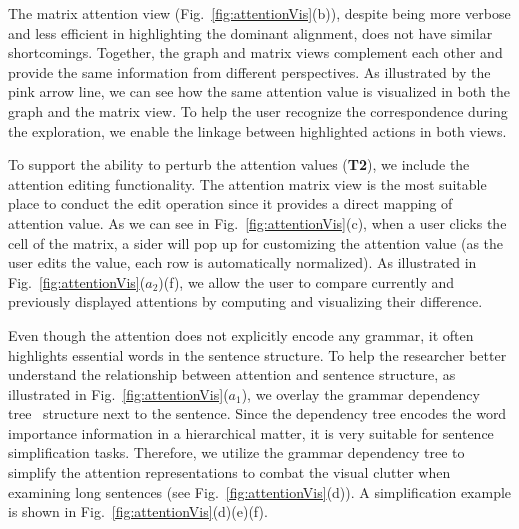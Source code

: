 The matrix attention view (Fig.~\ref{fig:attentionVis}(b)), despite being more verbose and less efficient in highlighting the dominant alignment, does not have similar shortcomings. Together, the graph and matrix views complement each other and provide the same information from different perspectives. As illustrated by the pink arrow line, we can see how the same attention value is visualized in both the graph and the matrix view.
To help the user recognize the correspondence during the exploration, we enable the linkage between highlighted actions in both views.

To support the ability to perturb the attention values (\textbf{T2}), we include the attention editing functionality. The attention matrix view is the most suitable place to conduct the edit operation since it provides a direct mapping of attention value.
As we can see in Fig.~\ref{fig:attentionVis}(c), when a user clicks the cell of the matrix, a sider will pop up for customizing the attention value (as the user edits the value, each row is automatically normalized).
%
As illustrated in Fig.~\ref{fig:attentionVis}($a_{2}$)(f), we allow the user to compare currently and previously displayed attentions by computing and visualizing their difference.


Even though the attention does not explicitly encode any grammar, it often highlights essential words in the sentence structure.
%
To help the researcher better understand the relationship between attention and sentence structure, as illustrated in Fig.~\ref{fig:attentionVis}($a_{1}$), we overlay the grammar dependency tree~\cite{Nivre2005} structure next to the sentence.
%
Since the dependency tree encodes the word importance information in a hierarchical matter, it is very suitable for sentence simplification tasks.
Therefore, we utilize the grammar dependency tree to simplify the attention representations to combat the visual clutter when examining long sentences (see Fig.~\ref{fig:attentionVis}(d)).
A simplification example is shown in  Fig.~\ref{fig:attentionVis}(d)(e)(f).




